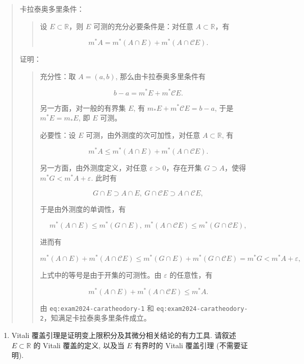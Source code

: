 \documentclass[
]{article}
\providecommand{\tightlist}{%
  \setlength{\itemsep}{0pt}\setlength{\parskip}{0pt}}
\begin{document}
\begin{quote}
卡拉泰奥多里条件：

\begin{quote}
设 \(E \subset \mathbb{R}\)，则 \(E\) 可测的充分必要条件是：对任意
\(A \subset \mathbb{R}\)，有

\[m^* A = m^*(A \cap E) + m^*(A \cap \mathscr{C} E).\]
\end{quote}

证明：

\begin{quote}
充分性：取 \(A = (a, b)\), 那么由卡拉泰奥多里条件有

\[b - a = m^* E + m^* \mathscr{C} E.\]

另一方面，对一般的有界集 \(E\), 有
\(m_* E + m^* \mathscr{C} E = b - a\), 于是 \(m^* E = m_* E\), 即 \(E\)
可测。

必要性：设 \(E\) 可测，由外测度的次可加性，对任意
\(A \subset \mathbb{R}\), 有

{\[m^* A \leqslant m^*(A \cap E) + m^*(A \cap \mathscr{C} E).\]}

另一方面，由外测度定义，对任意 \(\varepsilon > 0\)，存在开集
\(G \supset A\)，使得 \(m^* G < m^* A + \varepsilon\). 此时有

\[G \cap E \supset A \cap E, ~ G \cap \mathscr{C} E \supset A \cap \mathscr{C} E,\]

于是由外测度的单调性，有

\[m^* (A \cap E) \leqslant m^* (G \cap E), ~ m^* (A \cap \mathscr{C} E) \leqslant m^* (G \cap \mathscr{C} E),\]

进而有

\[m^* (A \cap E) + m^* (A \cap \mathscr{C} E) \leqslant m^* (G \cap E) + m^* (G \cap \mathscr{C} E) = m^* G < m^* A + \varepsilon,\]

上式中的等号是由于开集的可测性。由 \(\varepsilon\) 的任意性，有

{\[m^* (A \cap E) + m^* (A \cap \mathscr{C} E) \leqslant m^* A.\]}

由 \texttt{eq:exam2024-caratheodory-1} 和
\texttt{eq:exam2024-caratheodory-2}，知满足卡拉泰奥多里条件成立。
\end{quote}
\end{quote}

\begin{enumerate}
\def\labelenumi{\arabic{enumi}.}
\setcounter{enumi}{1}
\tightlist
\item
  Vitali 覆盖引理是证明变上限积分及其微分相关结论的有力工具. 请叙述
  \(E\subset \mathbb{R}\) 的 Vitali 覆盖的定义, 以及当 \(E\) 有界时的
  Vitali 覆盖引理 (不需要证明).
\end{enumerate}
\end{document}
